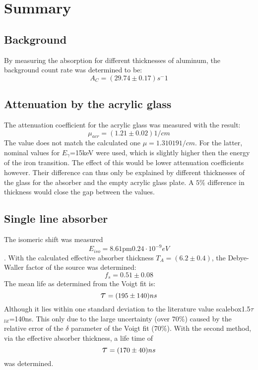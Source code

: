 \section{Summary}
\subsection{Background}
By measuring the absorption for different thicknesses of aluminum, the background count rate was determined to be:
\begin{equation*}
A_C= (29.74\pm0.17)s^-1
\end{equation*}	
\subsection{Attenuation by the acrylic glass}
The attenuation coefficient for the acrylic glass was measured with the result:
\begin{equation*}
\mu_{acr}=\unit{(1.21\pm0.02)}{1/cm}
\end{equation*}
The value does not match the calculated one $\mu=\unit{1.31019}{1/cm}$. For the latter, nominal values for $E_\gamma$=\unit{15}{keV} were used, which is slightly higher then the energy of the iron transition. The effect of this would be lower attenuation coefficients however. Their difference can thus only be explained by different thicknesses of the glass for the absorber and the empty acrylic glass plate. A $5\%$ difference in thickness would close the gap between the values.
\subsection{Single line absorber}
The isomeric shift was measured
\begin{equation*}
E_{iso}= \unit{8.61\pm0.24\cdot10^{-9}}{eV}
\end{equation*}. 
With the calculated effective absorber thickness $T_A=(6.2\pm0.4)$, the Debye-Waller factor of the source was determined:
\begin{equation*}
f_s=0.51\pm0.08
\end{equation*}
The mean life as determined from the Voigt fit is:
\begin{equation*}
\scalebox{1.5}{$\tau$}=\unit{(195\pm140)}{ns}
\end{equation*}
Although it lies within one standard deviation to the literature value scalebox{1.5}{$\tau$}$_{lit}$=\unit{140}{ns}. This only due to the large uncertainty (over $70\%$) caused by the relative error of the $\delta$ parameter of the Voigt fit ($70\%$). With the second method, via the effective absorber thickness, a life time of
\begin{equation*}
\scalebox{1.5}{$\tau$}= \unit{(170\pm40)}{ns}
\end{equation*}
was determined.
